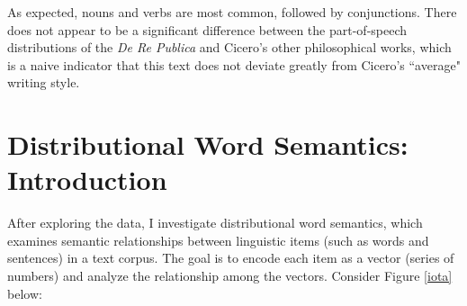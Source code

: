 \documentclass[a4paper, 12pt,notitlepage]{article} %
\numberwithin{dummy}{subsection}
\numberwithin{dummy}{section}
\theoremstyle{named}
\theoremstyle{definition}
\theoremstyle{definition}
\begin{document}
\noindent As expected, nouns and verbs are most common, followed by conjunctions. There does not appear to be a significant difference between the part-of-speech distributions of the \textit{De Re Publica} and Cicero's other philosophical works, which is a naive indicator that this text does not deviate greatly from Cicero's ``average" writing style.

\section{Distributional Word Semantics: Introduction}

After exploring the data, I investigate distributional word semantics, which examines semantic relationships between linguistic items (such as words and sentences) in a text corpus. The goal is to encode each item as a vector (series of numbers) and analyze the relationship among the vectors. Consider Figure \ref{iota} below:
\end{document}
